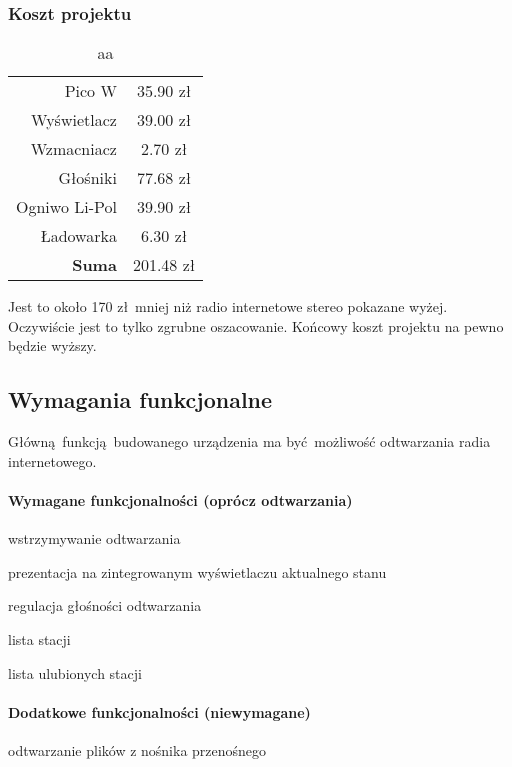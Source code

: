 \documentclass[12pt]{article}
\let\tempone\itemize
\let\temptwo\enditemize
\renewenvironment{itemize}{\tempone\setlength{\itemsep}{0cm}}{\temptwo}
\begin{document}
	\subsubsection{Koszt projektu}
	\begin{table}[H]
		\centering
		\caption{aa}
		\vspace{0.3cm}
		\begin{tabular}{r|S}
			Pico W&35.90 zł\\
			Wyświetlacz&39.00 zł\\
			Wzmacniacz&2.70 zł\\
			Głośniki&77.68 zł\\
			Ogniwo Li-Pol&39.90 zł\\
			Ładowarka&6.30 zł\\
			\textbf{Suma}&201.48 zł
		\end{tabular}
	\end{table}

	Jest to około 170 zł mniej niż radio internetowe stereo pokazane wyżej. Oczywiście jest to tylko zgrubne oszacowanie. Końcowy koszt projektu na pewno będzie wyższy.
		
	\subsection{Wymagania funkcjonalne}
		Główną funkcją budowanego urządzenia ma być możliwość odtwarzania radia internetowego. \paragraph{Wymagane funkcjonalności (oprócz odtwarzania)}
		\begin{itemize}
			\item wstrzymywanie odtwarzania
			\item prezentacja na zintegrowanym wyświetlaczu aktualnego stanu
			\item regulacja głośności odtwarzania
			\item lista stacji
			\item lista ulubionych stacji
		\end{itemize}
		
		\paragraph{Dodatkowe funkcjonalności (niewymagane)}
		\begin{itemize}
			\item odtwarzanie plików z nośnika przenośnego
		\end{itemize}
	
\end{document}
